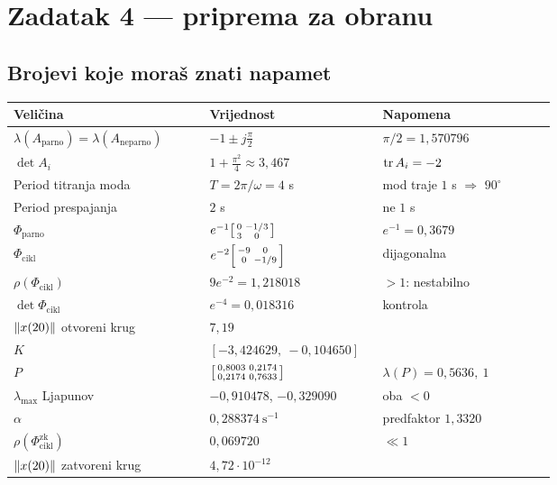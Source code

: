 \chapter{Zadatak 4 --- priprema za obranu}
\label{ch:z4-obrana}

\section{Brojevi koje moraš znati napamet}
\label{sec:z4o-brojevi}

\begin{longtable}{@{}p{0.34\linewidth} p{0.30\linewidth} p{0.30\linewidth}@{}}
\toprule
\textbf{Veličina} & \textbf{Vrijednost} & \textbf{Napomena} \\
\midrule
\endhead
$\lambda(A_{\mathrm{parno}}) = \lambda(A_{\mathrm{neparno}})$ & $-1 \pm j\tfrac{\pi}{2}$ & $\pi/2 = 1{,}570796$ \\
$\det A_i$ & $1 + \tfrac{\pi^2}{4} \approx 3{,}467$ & $\operatorname{tr} A_i = -2$ \\
Period titranja moda & $T = 2\pi/\omega = 4$ s & mod traje $1$ s $\Rightarrow$ $90^\circ$ \\
Period prespajanja & $2$ s & ne $1$ s \\
$\Phi_{\mathrm{parno}}$ & $e^{-1}\begin{bsmallmatrix} 0 & -1/3 \\ 3 & 0\end{bsmallmatrix}$ & $e^{-1} = 0{,}3679$ \\
$\Phi_{\mathrm{cikl}}$ & $e^{-2}\begin{bsmallmatrix} -9 & 0 \\ 0 & -1/9\end{bsmallmatrix}$ & dijagonalna \\
$\rho(\Phi_{\mathrm{cikl}})$ & $9e^{-2} = 1{,}218018$ & $> 1$: nestabilno \\
$\det \Phi_{\mathrm{cikl}}$ & $e^{-4} = 0{,}018316$ & kontrola \\
$\left\lVert x(20) \right\rVert$ otvoreni krug & $7{,}19$ & \\
$K$ & $[-3{,}424629,\ -0{,}104650]$ & \\
$P$ & $\begin{bsmallmatrix} 0{,}8003 & 0{,}2174 \\ 0{,}2174 & 0{,}7633\end{bsmallmatrix}$ & $\lambda(P) = 0{,}5636,\ 1$ \\
$\lambda_{\max}$ Ljapunov & $-0{,}910478$, $-0{,}329090$ & oba $< 0$ \\
$\alpha$ & $0{,}288374\ \mathrm{s}^{-1}$ & predfaktor $1{,}3320$ \\
$\rho(\Phi_{\mathrm{cikl}}^{\mathrm{zk}})$ & $0{,}069720$ & $\ll 1$ \\
$\left\lVert x(20) \right\rVert$ zatvoreni krug & $4{,}72\cdot10^{-12}$ & \\
\bottomrule
\end{longtable}

